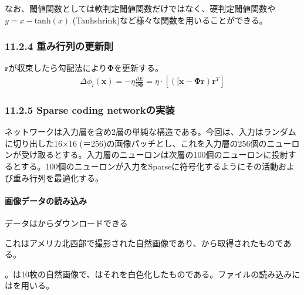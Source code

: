\documentclass[letterpaper,10pt,english]{sphinxmanual}
\begin{document}
なお、閾値関数としては軟判定閾値関数だけではなく、硬判定閾値関数や\(y=x - \text{tanh}(x)\) (Tanh\sphinxhyphen{}shrink)など様々な関数を用いることができる。


\subsubsection{11.2.4 重み行列の更新則}
\label{\detokenize{11-2_sparse-coding:id6}}
\(\mathbf{r}\)が収束したら勾配法により\(\mathbf{\Phi}\)を更新する。
\begin{equation*}
\begin{split}
\Delta \phi_i(\boldsymbol{x}) = -\eta \frac{\partial E}{\partial \mathbf{\Phi}}=\eta\cdot\left[\left([\mathbf{x}-\mathbf{\Phi}\mathbf{r}\right)\mathbf{r}^T\right]
\end{split}
\end{equation*}

\subsubsection{11.2.5 Sparse coding networkの実装}
\label{\detokenize{11-2_sparse-coding:sparse-coding-network}}
ネットワークは入力層を含め2層の単純な構造である。今回は、入力はランダムに切り出した16×16 (＝256)の画像パッチとし、これを入力層の256個のニューロンが受け取るとする。入力層のニューロンは次層の100個のニューロンに投射するとする。100個のニューロンが入力をSparseに符号化するようにその活動および重み行列を最適化する。


\paragraph{画像データの読み込み}
\label{\detokenize{11-2_sparse-coding:id7}}
データはからダウンロードできる %
\begin{footnote}[4]\sphinxAtStartFootnote
これはアメリカ北西部で撮影された自然画像であり、から取得されたものである。
%
\end{footnote}。は10枚の自然画像で、はそれを白色化したものである。ファイルの読み込みにはを用いる。

\begin{sphinxVerbatim}[commandchars=\\\{\}]
 
\end{sphinxVerbatim}
\end{document}
